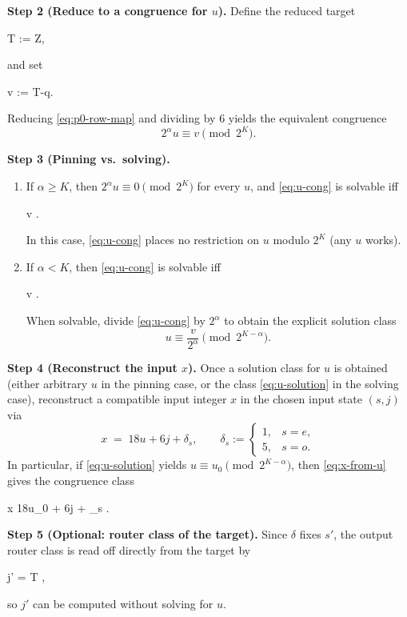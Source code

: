 \documentclass[11pt,letterpaper]{amsart}
\def\mathrm#1{#1}%
\def\mathbb#1{#1}%
\def\[{ }%
\def\]{ }%
\theoremstyle{definition}
\theoremstyle{plain}
\theoremstyle{plain}
\theoremstyle{remark}
\begin{document}
\smallskip
\noindent\textbf{Step 2 (Reduce to a congruence for $u$).}
Define the reduced target
\[
T := \frac{x_{\mathrm{tar}}-\delta}{6}\in\mathbb Z,
\]
and set
\[
v := T-q.
\]
Reducing \eqref{eq:p0-row-map} and dividing by $6$ yields the equivalent congruence
\begin{equation}\label{eq:u-cong}
2^\alpha u \equiv v \pmod{2^K}.
\end{equation}

\smallskip
\noindent\textbf{Step 3 (Pinning vs.\ solving).}
\begin{enumerate}
\item[\emph{(Pinning)}] If $\alpha\ge K$, then $2^\alpha u \equiv 0\pmod{2^K}$ for every $u$, and \eqref{eq:u-cong} is solvable iff
\[
v  .
\]
In this case, \eqref{eq:u-cong} places no restriction on $u$ modulo $2^K$ (any $u$ works).
\item[\emph{(Solving)}] If $\alpha< K$, then \eqref{eq:u-cong} is solvable iff
\[
v  .
\]
When solvable, divide \eqref{eq:u-cong} by $2^\alpha$ to obtain the explicit solution class
\begin{equation}\label{eq:u-solution}
u \equiv \frac{v}{2^\alpha} \pmod{2^{K-\alpha}}.
\end{equation}
\end{enumerate}

\smallskip
\noindent\textbf{Step 4 (Reconstruct the input $x$).}
Once a solution class for $u$ is obtained (either arbitrary $u$ in the pinning case, or the class \eqref{eq:u-solution} in the solving case), reconstruct a compatible input integer $x$ in the chosen input state $(s,j)$ via
\begin{equation}\label{eq:x-from-u}
x \;=\; 18u + 6j + \delta_s,
\qquad
\delta_s :=
\begin{cases}
1,& s=e,\\
5,& s=o.
\end{cases}
\end{equation}
In particular, if \eqref{eq:u-solution} yields $u\equiv u_0 \pmod{2^{K-\alpha}}$, then \eqref{eq:x-from-u} gives the congruence class
\[
x \equiv 18u_0 + 6j + \delta_s .
\]

\smallskip
\noindent\textbf{Step 5 (Optional: router class of the target).}
Since $\delta$ fixes $s'$, the output router class is read off directly from the target by
\[
j' \equiv \left\lfloor{}\right\rfloor \equiv \frac{x_{\mathrm{tar}}-\delta}{6} = T ,
\]
so $j'$ can be computed without solving for $u$.
\end{document}
